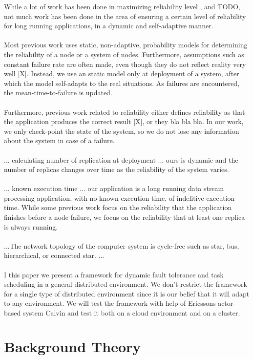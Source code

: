 \documentclass{cslthse-msc}
\begin{document}
While a lot of work has been done in maximizing reliability level \cite{X}, and TODO, not much work has been done in the area of ensuring a certain level of reliability for long running applications, in a dynamic and self-adaptive manner.
\\\\
Most previous work uses static, non-adaptive, probability models for determining the reliability of a node or a system of nodes. Furthermore, assumptions such as constant failure rate are often made, even though they do not reflect reality very well [X]. Instead, we use an static model only at deployment of a system, after which the model self-adapts to the real situations. As failures are encountered, the mean-time-to-failure is updated.
\\\\
Furthermore, previous work related to reliability either defines reliability as that the application produces the correct result [X], or they bla bla bla. In our work, we only check-point the state of the system, so we do not lose any information about the system in case of a failure. 
\\\\
... calculating number of replication at deployment ... ours is dynamic and the number of replicas changes over time as the reliability of the system varies.
\\\\
... known execution time ... our application is a long running data stream processing application, with no known execution time, of indefitive execution time. While some previous work focus on the reliability that the application finishes before a node failure, we focus on the reliability that at least one replica is always running.
\\\\
...The network topology of the computer system is cycle-free such as star, bus, hierarchical, or connected star. \cite{taskAllocation}...
\\\\

I this paper we present a framework for dynamic fault tolerance and task scheduling in a general distributed environment. We don't restrict the framework for a single type of distributed environment since it is our belief that it will adapt to any environment. We will test the framework with help of Ericssons actor-based system Calvin and test it both on a cloud environment and on a cluster.
\fi 

\chapter{Background Theory} \label{ch:background_theory}
\end{document}
